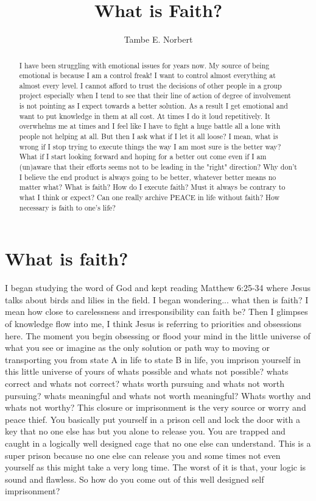 \documentclass{article}[12pt]
\begin{document}
\title{What is Faith?}%
\author{Tambe E. Norbert}

\maketitle

\begin{abstract}
I have been struggling with emotional issues for years now. My source of being emotional is because I am a control freak! I want to control almost everything at almost every level. I cannot afford to trust the decisions of other people in a group project especially when I tend to see that their line of action of degree of involvement is not pointing as I expect towards a better solution. As a result I get emotional and want to put knowledge in them at all cost. At times I do it loud repetitively. It overwhelms me at times and I feel like I have to fight a huge battle all a lone with people not helping at all. But then I ask what if I let it all loose? I mean, what is wrong if I stop trying to execute things the way I am  most sure is the better way? What if I start looking forward and hoping for a better out come even if I am  (un)aware that their efforts seems not to be leading in the "right" direction? Why don't I believe the end product is always going to be better, whatever better means no matter what? What is faith? How do I execute faith? Must it always be contrary to what I think or expect? Can one really archive PEACE in life without faith? How necessary is faith to one's life?
\end{abstract}

\section{What is faith?}

I began studying the word of God and kept reading Matthew 6:25-34 where Jesus talks about birds and lilies in the field. I began wondering... what then is faith? I mean how close to carelessness and irresponsibility can faith be?
Then I glimpses of knowledge flow into me, I think Jesus is referring to priorities and obsessions here. The moment you begin obsessing or flood your mind in the little universe of what you see or imagine as the only solution or path way to moving or transporting you from state A in life to state B in life, you imprison yourself in this little universe of yours of whats possible and whats not possible? whats correct and whats not correct? whats worth pursuing and whats not worth pursuing? whats meaningful and whats not worth meaningful? Whats worthy and whats not worthy?
This closure or imprisonment is the very source or worry and peace thief.
You basically put yourself in a prison cell and lock the door with a key that no one else has but you alone to release you. You are trapped and caught in a logically well designed cage that no one else can understand. This is a super prison because no one else can release you and some times not even yourself as this might take a very long time. The worst of it is that, your logic is sound and flawless. So how do you come out of this well designed self imprisonment?
\end{document}
